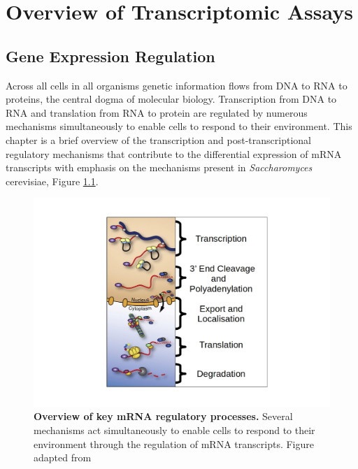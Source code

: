 \documentclass[../main.tex]{subfiles}
\begin{document}
\chapter{Overview of Transcriptomic Assays}

\section{Gene Expression Regulation}

Across all cells in all organisms genetic information flows from DNA to RNA to proteins, the central dogma of molecular biology.
Transcription from DNA to RNA and translation from RNA to protein are regulated by numerous mechanisms simultaneously to enable cells to respond to their environment.
This chapter is a brief overview of the transcription and post-transcriptional regulatory mechanisms that contribute to the differential expression of mRNA transcripts with emphasis on the mechanisms present in \textit{Saccharomyces} cerevisiae, Figure \ref{fig:mrna-regulation}. 

\begin{figure}[h]

{\centering \includegraphics[width=\linewidth]{figures/post-transcriptional-regulation} 

}

\caption[Overview of key mRNA regulatory processes.]{\textbf{Overview of key mRNA regulatory processes.} Several mechanisms act simultaneously to enable cells to respond to their environment through the regulation of mRNA transcripts. Figure adapted from \cite{Corbett2018}}\label{fig:mrna-regulation}
\end{figure}
\end{document}
